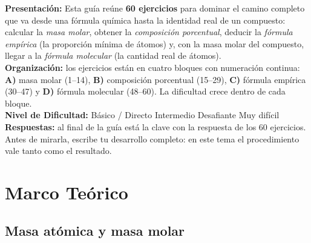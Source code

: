 \documentclass[12pt, letterpaper]{article}
\begin{document}


\vspace{4pt}
\begin{cuadroinfo}
  \small
  \textbf{Presentación:} Esta guía reúne \textbf{60 ejercicios} para dominar el camino completo que va desde una fórmula química hasta la identidad real de un compuesto: calcular la \emph{masa molar}, obtener la \emph{composición porcentual}, deducir la \emph{fórmula empírica} (la proporción mínima de átomos) y, con la masa molar del compuesto, llegar a la \emph{fórmula molecular} (la cantidad real de átomos).
  \\[4pt]
  \textbf{Organización:} los ejercicios están en cuatro bloques con numeración continua: \textbf{A)} masa molar (1--14), \textbf{B)} composición porcentual (15--29), \textbf{C)} fórmula empírica (30--47) y \textbf{D)} fórmula molecular (48--60). La dificultad crece dentro de cada bloque.
  \\[4pt]
  \textbf{Nivel de Dificultad:}\quad
  \facil{}\hspace{0.55em}Básico / Directo \quad
  \medio{}\hspace{0.55em}Intermedio \quad
  \dificil{}\hspace{0.55em}Desafiante \quad
  \muyDificil{}\hspace{0.55em}Muy difícil
  \\[4pt]
  \textbf{Respuestas:} al final de la guía está la clave con la respuesta de los 60 ejercicios. Antes de mirarla, escribe tu desarrollo completo: en este tema el procedimiento vale tanto como el resultado.
\end{cuadroinfo}

\vspace{8pt}

\section{Marco Teórico}

\subsection{Masa atómica y masa molar}
\end{document}
